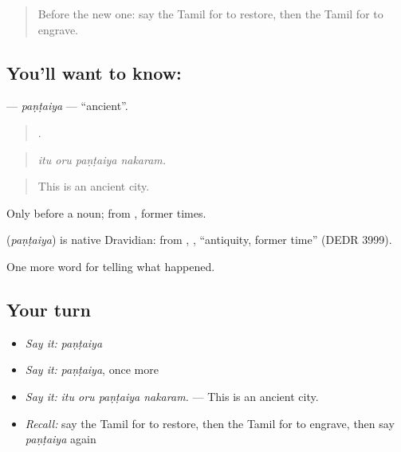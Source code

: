 \label{lesson:TA-C342-pantaiya}



\begin{quote}
Before the new one: say the Tamil for to restore, then the Tamil for to engrave.
\end{quote}

\subsection*{You'll want to know: }
\textbf{} — \emph{paṇṭaiya} — \textquotedblleft{}ancient\textquotedblright{}.

\begin{quote}
   .
\end{quote}

\begin{quote}
\emph{itu oru paṇṭaiya nakaram.}
\end{quote}

\begin{quote}
This is an ancient city.
\end{quote}

Only before a noun; from , former times.

\begin{cousinweb}
\textbf{} (\emph{paṇṭaiya}) is native Dravidian: from , , \textquotedblleft{}antiquity, former time\textquotedblright{} (DEDR 3999).
\end{cousinweb}

\begin{grammarlens}[title={What you've built}]
One more word for telling what happened.
\end{grammarlens}

\subsection*{Your turn}
\begin{itemize}
\raggedright
  \item \emph{Say it:} \emph{paṇṭaiya}
  \item \emph{Say it:} \emph{paṇṭaiya}, once more
  \item \emph{Say it:} \emph{itu oru paṇṭaiya nakaram.} — This is an ancient city.
  \item \emph{Recall:} say the Tamil for to restore, then the Tamil for to engrave, then say \emph{paṇṭaiya} again
\end{itemize}


